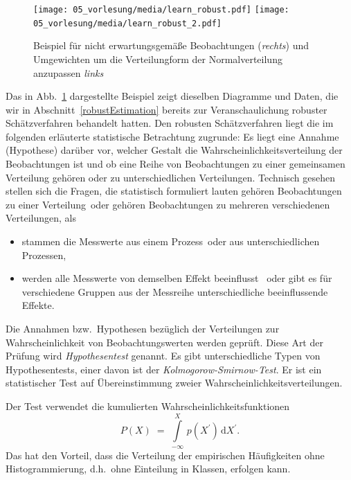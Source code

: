 \begin{figure}
\begin{center}
\texttt{[image: 05\_vorlesung/media/learn\_robust.pdf]}
\texttt{[image: 05\_vorlesung/media/learn\_robust\_2.pdf]}
\caption{Beispiel für nicht erwartungsgemäße Beobachtungen (\textsl{rechts}) und
Umgewichten um die Verteilungform der Normalverteilung anzupassen \textsl{links}}
\label{biasExample}
\end{center}
\end{figure}
Das in Abb.~\ref{biasExample} dargestellte Beispiel zeigt dieselben Diagramme und
Daten, die wir in Abschnitt~\ref{robustEstimation} bereits zur Veranschaulichung
robuster Schätzverfahren behandelt hatten. Den robusten Schätzverfahren liegt die
im folgenden erläuterte statistische Betrachtung zugrunde: Es liegt eine Annahme
(Hypothese) darüber vor, welcher Gestalt die Wahrscheinlichkeitsverteilung der
Beobachtungen ist und ob eine Reihe von Beobachtungen zu einer gemeinsamen Verteilung
gehören oder zu unterschiedlichen Verteilungen. Technisch gesehen stellen sich die
Fragen, die statistisch formuliert lauten \glqq gehören Beobachtungen zu einer
Verteilung\grqq ~oder \glqq gehören Beobachtungen zu mehreren verschiedenen Verteilungen\grqq,
als
\begin{itemize}
\item \glqq stammen die Messwerte aus einem Prozess\grqq ~oder \glqq aus unterschiedlichen
Prozessen\grqq,
\item \glqq werden alle Messwerte von demselben Effekt beeinflusst \grqq ~oder \glqq gibt es
für verschiedene Gruppen aus der Messreihe unterschiedliche beeinflussende Effekte\grqq.
\end{itemize}
Die Annahmen bzw.\ Hypothesen bezüglich der Verteilungen zur Wahrscheinlichkeit
von Beobachtungswerten werden geprüft. Diese Art der Prüfung wird \textsl{Hypothesentest}
genannt. Es gibt unterschiedliche Typen von Hypothesentests, einer davon ist
der \textsl{Kolmogorow-Smirnow-Test}.
Er ist ein statistischer Test auf Übereinstimmung zweier Wahrscheinlichkeitsverteilungen.

Der Test verwendet die kumulierten Wahrscheinlichkeitsfunktionen
\begin{equation}
P(X) \; = \; \int\limits_{-\infty}^X \, p(X^\prime) \, \mathrm{d} X^\prime .
\end{equation}
Das hat den Vorteil, dass
die Verteilung der empirischen Häufigkeiten ohne Histogrammierung, d.h.\ ohne Einteilung in Klassen,
erfolgen kann.

